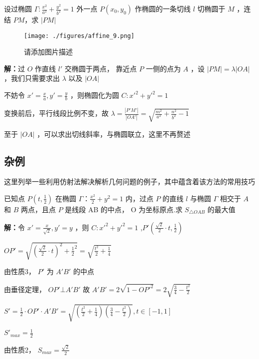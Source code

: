 \begin{corollary}{}
设过椭圆 $\displaystyle{\Gamma:\frac{x^2}{a^2}+\frac{y^2}{b^2}=1}$ 外一点 $\displaystyle{P(x_0,y_0)}$ 作椭圆的一条切线 $\displaystyle{l}$ 切椭圆于 $\displaystyle{M}$ ，连结 $\displaystyle{PM}$，求 $\displaystyle{|PM|}$
\begin{figure}[ht]
\centering
\texttt{[image: ./figures/affine\_9.png]}
\caption{请添加图片描述} \label{affine_fig9}
\end{figure}
\textbf{解：}过 $\displaystyle{O}$ 作直线 $\displaystyle{l'}$ 交椭圆于两点， 靠近点 $\displaystyle{P}$ 一侧的点为 $\displaystyle{A}$ ，设 $\displaystyle{|PM|=\lambda|OA|}$ ，我们只需要求出 $\displaystyle{\lambda}$ 以及 $\displaystyle{|OA|}$ 

不妨令 $\displaystyle{x'=\frac{x}{a},y'=\frac{y}{b}}$ ，则椭圆化为圆 $\displaystyle{C:x'^2+y'^2=1}$

变换前后，平行线段比例不变，故 $\displaystyle{\lambda=\frac{|P'M'|}{|OA'|}=\sqrt{\frac{m^2}{a^2}+\frac{n^2}{b^2}-1}}$ 

至于 $\displaystyle{|OA|}$ ，可以求出切线斜率，与椭圆联立，这里不再赘述
\end{corollary}

\subsection{杂例}
这里列举一些利用仿射法解决解析几何问题的例子，其中蕴含着该方法的常用技巧
\begin{example}{}
已知点 $\displaystyle{P\left(t,\frac{1}{2}\right)}$ 在椭圆 $\displaystyle{\Gamma：\frac{x^2}{2}+y^2=1}$ 内，过点 $\displaystyle{P}$ 的直线 $\displaystyle{l}$ 与椭圆 $\displaystyle{\Gamma}$ 相交于 $\displaystyle{A}$ 和 $\displaystyle{B}$ 两点，且点 $\displaystyle{P}$ 是线段 AB 的中点， O 为坐标原点.求 $\displaystyle{S_{\triangle OAB}}$ 的最大值

\textbf{解：}令 $\displaystyle{x'=\frac{x}{\sqrt{2}},y'=y}$ ，则 $\displaystyle{C:x'^2+y'^2=1}$ ,$\displaystyle{P'\left(\frac{\sqrt{2}}{2}\cdot t,\frac{1}{2}\right)}$

$\displaystyle{OP'=\sqrt{\left(\frac{\sqrt{2}}{2}\cdot t\right)^2+{\frac{1}{2}}^2}=\sqrt{\frac{t^2}{2}+\frac{1}{4}}}$

由性质3， $\displaystyle{P'}$ 为 $\displaystyle{A'B'}$ 的中点

由垂径定理， $\displaystyle{OP'\bot A'B'}$ 
故 $\displaystyle{A'B'=2\sqrt{1-OP'^2}=2\sqrt{\frac{3}{4}-\frac{t^2}{2}}}$

$\displaystyle{S'=\frac{1}{2}\cdot OP' \cdot A'B'=\sqrt{\left(\frac{t^2}{2}+\frac{1}{4}\right)\left(\frac{3}{4}-\frac{t^2}{2}\right)},t\in[-1,1]}$

$\displaystyle{S'_{max}=\frac{1}{2}}$

由性质2， $\displaystyle{S_{max}=\frac{\sqrt{2}}{2}}$ 
\end{example}

